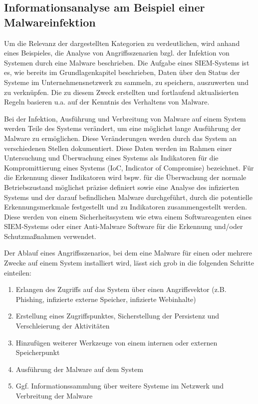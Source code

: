 \subsection{Informationsanalyse am Beispiel einer Malwareinfektion}
Um die Relevanz der dargestellten Kategorien zu verdeutlichen, wird anhand eines Beispieles, die Analyse von Angriffsszenarien bzgl. der Infektion von Systemen durch eine Malware beschrieben. Die Aufgabe eines SIEM-Systems ist es, wie bereits im Grundlagenkapitel beschrieben, Daten über den Status der Systeme im Unternehmensnetzwerk zu sammeln, zu speichern, auszuwerten und zu verknüpfen. Die zu diesem Zweck erstellten und fortlaufend aktualisierten Regeln basieren u.a. auf der Kenntnis des Verhaltens von Malware.

Bei der Infektion, Ausführung und Verbreitung von Malware auf einem System werden Teile des Systems verändert, um eine möglichst lange Ausführung der Malware zu ermöglichen. Diese Veränderungen werden durch das System an verschiedenen Stellen dokumentiert. Diese Daten werden im Rahmen einer Untersuchung und Überwachung eines Systems als Indikatoren für die Kompromittierung eines Systems (IoC, \glqq Indicator of Compromise\grqq ) bezeichnet. Für die Erkennung dieser Indikatoren wird bspw. für die Überwachung der normale Betriebszustand möglichst präzise definiert sowie eine Analyse des infizierten Systems und der darauf befindlichen Malware durchgeführt, durch die potentielle Erkennungsmerkmale festgestellt und zu Indikatoren zusammengestellt werden. Diese werden von einem Sicherheitssystem wie etwa einem Softwareagenten eines SIEM-Systems oder einer Anti-Malware Software für die Erkennung und/oder Schutzmaßnahmen verwendet.

Der Ablauf eines Angriffsszenarios, bei dem eine Malware für einen oder mehrere Zwecke auf einem System installiert wird, lässt sich grob in die folgenden Schritte einteilen:
\begin{enumerate}
\item Erlangen des Zugriffs auf das System über einen Angriffsvektor (z.B. Phishing, infizierte externe Speicher, infizierte Webinhalte)
\item Erstellung eines Zugriffspunktes, Sicherstellung der Persistenz und Verschleierung der Aktivitäten
\item Hinzufügen weiterer Werkzeuge von einem internen oder externen Speicherpunkt
\item Ausführung der Malware auf dem System
\item Ggf. Informationssammlung über weitere Systeme im Netzwerk und Verbreitung der Malware
\end{enumerate}

